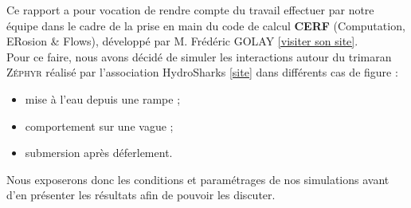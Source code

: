 \documentclass[../main.tex]{subfiles}
\begin{document}
Ce rapport a pour vocation de rendre compte du travail effectuer par notre équipe dans le cadre de la prise en main du code de calcul \textbf{CERF} (Computation, ERosion \& Flows), développé par M. Frédéric GOLAY \href{https://freddy.univ-tln.fr/}{[visiter son site]}.\\

Pour ce faire, nous avons décidé de simuler les interactions autour du trimaran \textsc{Zéphyr} réalisé par l'association HydroSharks \href{https://hydrosharks.github.io/WikiZephyr/}{[site]} dans différents cas de figure :
\begin{itemize}
    \item mise à l'eau depuis une rampe ;
    \item comportement sur une vague ;
    \item submersion après déferlement.
\end{itemize}

Nous exposerons donc les conditions et paramétrages de nos simulations avant d'en présenter les résultats afin de pouvoir les discuter.
\end{document}

